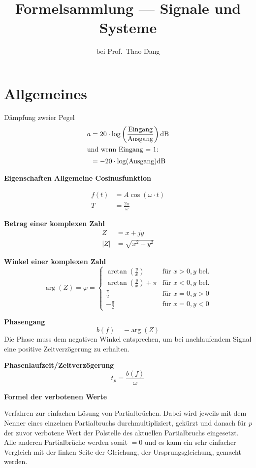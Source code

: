 \documentclass[12pt, a4paper]{scrartcl}
\title{Formelsammlung --- Signale und Systeme}
\subtitle{bei Prof.\ Thao Dang}
\begin{document}
\maketitle

\section{Allgemeines}

Dämpfung zweier Pegel
\begin{align*}
  a &= 20 \cdot \log \left(\frac{\text{Eingang}}{\text{Ausgang}} \right) \si{\decibel}\\
  \intertext{und wenn Eingang = 1:}
  &= -20 \cdot \log(\textrm{Ausgang}) \si{\decibel}
\end{align*}


\textbf{Eigenschaften Allgemeine Cosinusfunktion}

\begin{align*}
  f(t) &= A\cos(\omega \cdot t)\\
  T &= \frac{2\pi}{\omega}
\end{align*}

\textbf{Betrag einer komplexen Zahl}
\begin{align*}
  Z &= x+ jy\\
  |Z| &= \sqrt{x^2 +y^2}
\end{align*}

\textbf{Winkel einer komplexen Zahl}
\[\arg (Z) = \varphi =
  \begin{cases}
    \arctan \left(\frac{y}{x}\right) & \text{für } x>0, y \text{ bel.}\\
    \arctan \left(\frac{y}{x}\right) + \pi & \text{für } x<0, y \text{ bel.}\\
    \frac{\pi}{2} & \text{für } x = 0, y > 0\\
    - \frac{\pi}{2} & \text{für } x = 0,y < 0
  \end{cases}\]

\textbf{Phasengang}
\[b(f) = -\arg(Z)\]
Die Phase muss dem negativen Winkel entsprechen, um bei nachlaufendem Signal eine positive Zeitverzögerung zu erhalten.

\textbf{Phasenlaufzeit/Zeitverzögerung}
\[t_p = \frac{b(f)}{\omega}\]

\textbf{Formel der verbotenen Werte}

Verfahren zur einfachen Lösung von Partialbrüchen. Dabei wird jeweils mit dem Nenner eines einzelnen Partialbruchs durchmultipliziert, gekürzt und danach für \(p\) der zuvor verbotene Wert der Polstelle des aktuellen Partialbruchs eingesetzt. Alle anderen Partialbrüche werden somit \(=0\) und es kann ein sehr einfacher Vergleich mit der linken Seite der Gleichung, der Ursprungsgleichung, gemacht werden.
\end{document}
